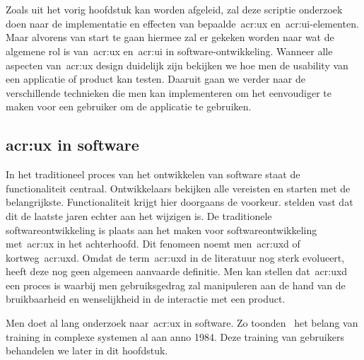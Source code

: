 \chapter{}
\label{ch:stand-van-zaken}


Zoals uit het vorig hoofdstuk kan worden afgeleid, zal deze scriptie onderzoek doen naar de implementatie en effecten van bepaalde~\acrshort{acr:ux} en~\acrshort{acr:ui}-elementen. Maar alvorens van start te gaan hiermee zal er gekeken worden naar wat de algemene rol is van~\acrshort{acr:ux} en~\acrshort{acr:ui} in software-ontwikkeling. Wanneer alle aspecten van~\acrshort{acr:ux} design duidelijk zijn bekijken we hoe men de usability van een applicatie of product kan testen. Daaruit gaan we verder naar de verschillende technieken die men kan implementeren om het eenvoudiger te maken voor een gebruiker om de applicatie te gebruiken.

\section{\acrlong{acr:ux} in software}
\label{sec:user-experience-in-software}

In het traditioneel proces van het ontwikkelen van software staat de functionaliteit centraal. Ontwikkelaars bekijken alle vereisten en starten met de belangrijkste. Functionaliteit krijgt hier doorgaans de voorkeur. \textcite{Harutyunyan2019} stelden vast dat dit de laatste jaren echter aan het wijzigen is. De traditionele softwareontwikkeling is plaats aan het maken voor softwareontwikkeling met~\acrlong{acr:ux} in het achterhoofd. Dit fenomeen noemt men~\acrfull{acr:uxd} of kortweg~\acrshort{acr:uxd}. Omdat de term~\acrshort{acr:uxd} in de literatuur nog sterk evolueert, heeft deze nog geen algemeen aanvaarde definitie. Men kan stellen dat~\acrlong{acr:uxd} een proces is waarbij men gebruiksgedrag zal manipuleren aan de hand van de bruikbaarheid en wenselijkheid in de interactie met een product.

Men doet al lang onderzoek naar~\acrlong{acr:ux} in software. Zo toonden~\textcite{Carroll1984} het belang van training in complexe systemen al aan anno 1984. Deze training van gebruikers behandelen we later in dit hoofdstuk.

